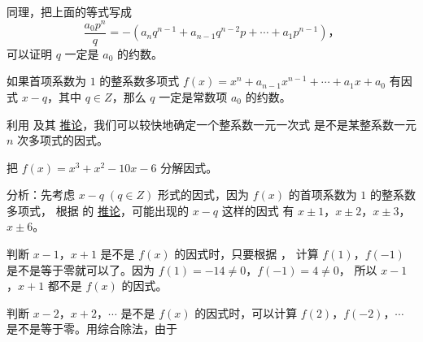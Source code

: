 同理，把上面的等式写成
$$ \dfrac{a_0 p^n}{q} = - (a_{n} q^{n-1} + a_{n-1} q^{n-2} p + \cdots + a_1 p^{n-1}) \text{，} $$
可以证明 $q$ 一定是 $a_0$ 的约数。

\begin{corollary} \label{corollary:dxs-2-1}
    如果首项系数为 $1$ 的整系数多项式  $f(x) = x^n + a_{n-1}x^{n-1} + \cdots + a_1x + a_0$
    有因式 $x - q$，其中 $q \in Z$，那么 $q$ 一定是常数项 $a_0$ 的约数。
\end{corollary}

利用  及其 \hyperref[corollary:dxs-2-1]{推论}，我们可以较快地确定一个整系数一元一次式
是不是某整系数一元 $n$ 次多项式的因式。


\liti 把 $f(x) = x^3 + x^2 - 10x - 6$ 分解因式\footnotemark。

分析：先考虑 $x - q \; (q \in Z)$ 形式的因式，因为 $f(x)$ 的首项系数为 $1$ 的整系数多项式，
根据  的 \hyperref[corollary:dxs-2-1]{推论}，可能出现的 $x - q$ 这样的因式
有 $x \pm 1$，$x \pm 2$，$x \pm 3$，$x \pm 6$。

判断 $x - 1$，$x + 1$ 是不是 $f(x)$ 的因式时，只要根据 ，
计算 $f(1)$，$f(-1)$ 是不是等于零就可以了。因为 $f(1) = -14 \neq 0$，$f(-1) = 4 \neq 0$，
所以 $x - 1$，$x + 1$ 都不是 $f(x)$ 的因式。

判断 $x - 2$，$x + 2$，$\cdots$ 是不是 $f(x)$ 的因式时，可以计算 $f(2)$，$f(-2)$，$\cdots$
是不是等于零。用综合除法，由于

